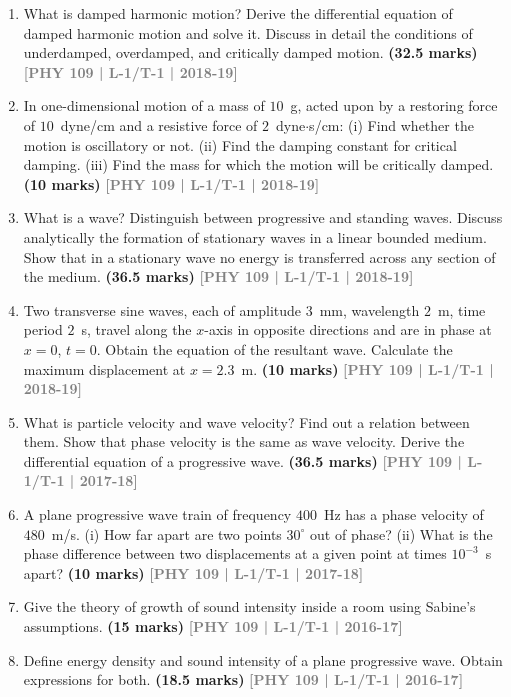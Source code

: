 \documentclass[12pt,a3paper]{article}
\newcommand{\yr}[1]{\hfill\textcolor{gray}{\small\textbf{[#1]}}}
\newcommand{\mk}[1]{\textcolor{orange!70!black}{\small\textbf{(#1 marks)}}}
\begin{document}
\begin{enumerate}
\item What is damped harmonic motion? Derive the differential equation of damped harmonic motion and solve it. Discuss in detail the conditions of underdamped, overdamped, and critically damped motion.
\mk{32.5} \yr{PHY 109 | L-1/T-1 | 2018-19}

\item In one-dimensional motion of a mass of $10$~g, acted upon by a restoring force of $10$~dyne/cm and a resistive force of $2$~dyne$\cdot$s/cm: (i) Find whether the motion is oscillatory or not. (ii) Find the damping constant for critical damping. (iii) Find the mass for which the motion will be critically damped.
\mk{10} \yr{PHY 109 | L-1/T-1 | 2018-19}

\item What is a wave? Distinguish between progressive and standing waves. Discuss analytically the formation of stationary waves in a linear bounded medium. Show that in a stationary wave no energy is transferred across any section of the medium.
\mk{36.5} \yr{PHY 109 | L-1/T-1 | 2018-19}

\item Two transverse sine waves, each of amplitude $3$~mm, wavelength $2$~m, time period $2$~s, travel along the $x$-axis in opposite directions and are in phase at $x = 0$, $t = 0$. Obtain the equation of the resultant wave. Calculate the maximum displacement at $x = 2.3$~m.
\mk{10} \yr{PHY 109 | L-1/T-1 | 2018-19}

\item What is particle velocity and wave velocity? Find out a relation between them. Show that phase velocity is the same as wave velocity. Derive the differential equation of a progressive wave.
\mk{36.5} \yr{PHY 109 | L-1/T-1 | 2017-18}

\item A plane progressive wave train of frequency $400$~Hz has a phase velocity of $480$~m/s. (i) How far apart are two points $30^\circ$ out of phase? (ii) What is the phase difference between two displacements at a given point at times $10^{-3}$~s apart?
\mk{10} \yr{PHY 109 | L-1/T-1 | 2017-18}

\item Give the theory of growth of sound intensity inside a room using Sabine's assumptions.
\mk{15} \yr{PHY 109 | L-1/T-1 | 2016-17}

\item Define energy density and sound intensity of a plane progressive wave. Obtain expressions for both.
\mk{18.5} \yr{PHY 109 | L-1/T-1 | 2016-17}


\end{enumerate}
\end{document}
